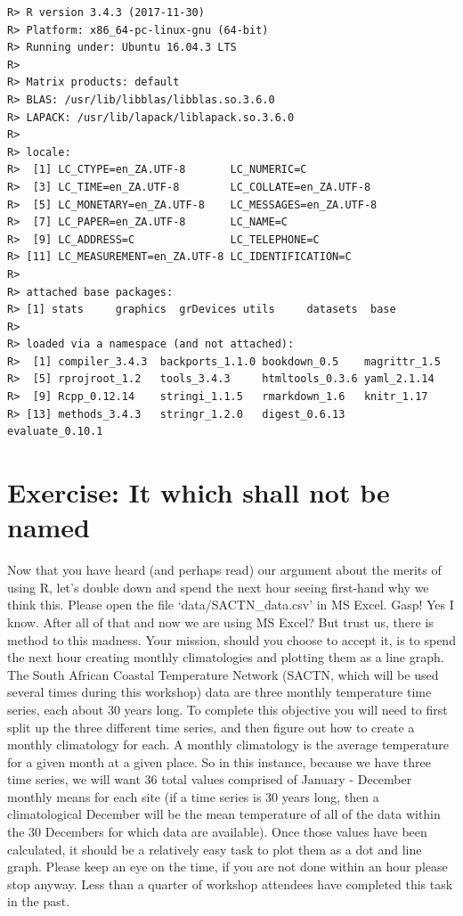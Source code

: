 \documentclass[]{book}
\theoremstyle{definition}
\theoremstyle{definition}
\theoremstyle{definition}
\theoremstyle{remark}
\begin{document}
\begin{verbatim}
R> R version 3.4.3 (2017-11-30)
R> Platform: x86_64-pc-linux-gnu (64-bit)
R> Running under: Ubuntu 16.04.3 LTS
R> 
R> Matrix products: default
R> BLAS: /usr/lib/libblas/libblas.so.3.6.0
R> LAPACK: /usr/lib/lapack/liblapack.so.3.6.0
R> 
R> locale:
R>  [1] LC_CTYPE=en_ZA.UTF-8       LC_NUMERIC=C              
R>  [3] LC_TIME=en_ZA.UTF-8        LC_COLLATE=en_ZA.UTF-8    
R>  [5] LC_MONETARY=en_ZA.UTF-8    LC_MESSAGES=en_ZA.UTF-8   
R>  [7] LC_PAPER=en_ZA.UTF-8       LC_NAME=C                 
R>  [9] LC_ADDRESS=C               LC_TELEPHONE=C            
R> [11] LC_MEASUREMENT=en_ZA.UTF-8 LC_IDENTIFICATION=C       
R> 
R> attached base packages:
R> [1] stats     graphics  grDevices utils     datasets  base     
R> 
R> loaded via a namespace (and not attached):
R>  [1] compiler_3.4.3  backports_1.1.0 bookdown_0.5    magrittr_1.5   
R>  [5] rprojroot_1.2   tools_3.4.3     htmltools_0.3.6 yaml_2.1.14    
R>  [9] Rcpp_0.12.14    stringi_1.1.5   rmarkdown_1.6   knitr_1.17     
R> [13] methods_3.4.3   stringr_1.2.0   digest_0.6.13   evaluate_0.10.1
\end{verbatim}

\section{Exercise: It which shall not be
named}\label{exercise-it-which-shall-not-be-named}

Now that you have heard (and perhaps read) our argument about the merits
of using R, let's double down and spend the next hour seeing first-hand
why we think this. Please open the file `data/SACTN\_data.csv' in MS
Excel. Gasp! Yes I know. After all of that and now we are using MS
Excel? But trust us, there is method to this madness. Your mission,
should you choose to accept it, is to spend the next hour creating
monthly climatologies and plotting them as a line graph. The South
African Coastal Temperature Network (SACTN, which will be used several
times during this workshop) data are three monthly temperature time
series, each about 30 years long. To complete this objective you will
need to first split up the three different time series, and then figure
out how to create a monthly climatology for each. A monthly climatology
is the average temperature for a given month at a given place. So in
this instance, because we have three time series, we will want 36 total
values comprised of January - December monthly means for each site (if a
time series is 30 years long, then a climatological December will be the
mean temperature of all of the data within the 30 Decembers for which
data are available). Once those values have been calculated, it should
be a relatively easy task to plot them as a dot and line graph. Please
keep an eye on the time, if you are not done within an hour please stop
anyway. Less than a quarter of workshop attendees have completed this
task in the past.
\end{document}
